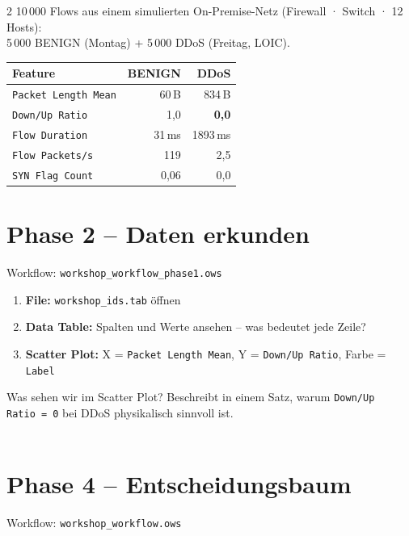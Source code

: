 \documentclass[a4paper, 10pt]{article}
\newcommand{\uebung}[2]{%
  \begin{tcolorbox}[uebstyle, title={Übung #1}]%
  \small #2%
  \end{tcolorbox}%
}
\begin{document}
\begin{multicols}{2}
10\,000 Flows aus einem simulierten On-Premise-Netz
(Firewall · Switch · 12 Hosts):\\
5\,000 BENIGN (Montag) + 5\,000 DDoS (Freitag, LOIC).

\smallskip
\begin{tabularx}{\linewidth}{@{}lrr@{}}
\toprule
\textbf{Feature} & \textbf{BENIGN} & \textbf{DDoS}\\
\midrule
\texttt{Packet Length Mean} & 60\,B & 834\,B\\
\texttt{Down/Up Ratio} & 1{,}0 & \textbf{0{,}0}\\
\texttt{Flow Duration} & 31\,ms & 1893\,ms\\
\texttt{Flow Packets/s} & 119 & 2{,}5\\
\texttt{SYN Flag Count} & 0{,}06 & 0{,}0\\
\bottomrule
\end{tabularx}

\section{Phase 2 – Daten erkunden}

Workflow: \texttt{workshop\_workflow\_phase1.ows}

\begin{enumerate}
\item \textbf{File:} \texttt{workshop\_ids.tab} öffnen
\item \textbf{Data Table:} Spalten und Werte ansehen –
      was bedeutet jede Zeile?
\item \textbf{Scatter Plot:}
      X = \texttt{Packet Length Mean},
      Y = \texttt{Down/Up Ratio},
      Farbe = \texttt{Label}
\end{enumerate}

\uebung{2}{%
  Was sehen wir im Scatter Plot?
  Beschreibt in einem Satz, warum
  \texttt{Down/Up Ratio\,=\,0} bei DDoS physikalisch sinnvoll ist.\\[10pt]
  \dotfill\\[8pt]
  \dotfill
}

\columnbreak

\section{Phase 4 – Entscheidungsbaum}

Workflow: \texttt{workshop\_workflow.ows}


\end{multicols}
\end{document}
